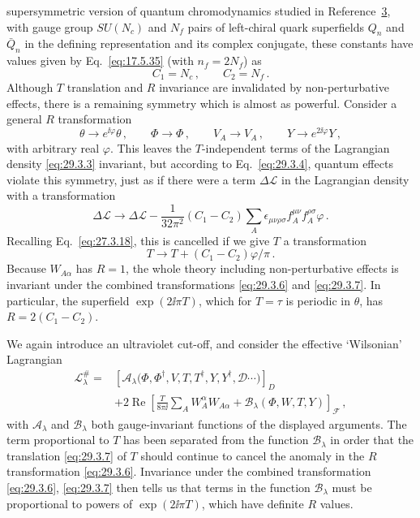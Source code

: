 supersymmetric version of quantum chromodynamics studied in
Reference~\hyperref[ch29-ref-3]{3}, with gauge group \(SU(N_c)\) and
\(N_f\) pairs of left-chiral quark superfields \(Q_n\) and \(\bar Q_n\)
in the defining representation and its complex conjugate, these constants
have values given by Eq.~\eqref{eq:17.5.35} (with \(n_f=2N_f\)) as
\[
  C_1=N_c\,,
  \qquad
  C_2=N_f\,.
\]
Although \(T\) translation and \(R\) invariance are invalidated by
non-perturbative effects, there is a remaining symmetry which is almost as
powerful. Consider a general \(R\) transformation
\begin{equation}
  \theta\longrightarrow e^{\ii\varphi}\theta\,,
  \qquad
  \Phi\longrightarrow\Phi\,,
  \qquad
  V_A\longrightarrow V_A\,,
  \qquad
  Y\longrightarrow e^{2\ii\varphi}Y\,,
  \tag{29.3.6}\label{eq:29.3.6}
\end{equation}
with arbitrary real \(\varphi\). This leaves the \(T\)-independent terms
of the Lagrangian density \eqref{eq:29.3.3} invariant, but according to
Eq.~\eqref{eq:29.3.4}, quantum effects violate this symmetry, just as if
there were a term \(\Delta\mathcal{L}\) in the Lagrangian density with a
transformation
\[
  \Delta\mathcal{L}
  \longrightarrow
  \Delta\mathcal{L}
  -\frac{1}{32\pi^2}(C_1-C_2)
  \sum_A\epsilon_{\mu\nu\rho\sigma}
  f_A^{\mu\nu}f_A^{\rho\sigma}\varphi\,.
\]
Recalling Eq.~\eqref{eq:27.3.18}, this is cancelled if we give \(T\) a
transformation
\begin{equation}
  T\longrightarrow T+(C_1-C_2)\varphi/\pi\,.
  \tag{29.3.7}\label{eq:29.3.7}
\end{equation}
Because \(W_{A\alpha}\) has \(R=1\), the whole theory including
non-perturbative effects is invariant under the combined transformations
\eqref{eq:29.3.6} and \eqref{eq:29.3.7}. In particular, the superfield
\(\exp(2\ii\pi T)\), which for \(T=\tau\) is periodic in \(\theta\), has
\(R=2(C_1-C_2)\).

We again introduce an ultraviolet cut-off, and consider the effective
`Wilsonian' Lagrangian
\begin{equation}
  \begin{aligned}
  \mathcal{L}^{\#}_\lambda
  ={}&
  \left[
    \mathcal{A}_\lambda
    \bigl(\Phi,\Phi^\dagger,V,T,T^\dagger,Y,Y^\dagger,
    \mathcal{D}\cdots\bigr)
  \right]_D
  \\
  &+2\operatorname{Re}
  \left[
    \frac{T}{8\pi \ii}
    \sum_AW_A^\alpha W_{A\alpha}
    +\mathcal{B}_\lambda(\Phi,W,T,Y)
  \right]_{\mathcal{F}}\,,
  \end{aligned}
  \tag{29.3.8}\label{eq:29.3.8}
\end{equation}
with \(\mathcal{A}_\lambda\) and \(\mathcal{B}_\lambda\) both
gauge-invariant functions of the displayed arguments. The term
proportional to \(T\) has been separated from the function
\(\mathcal{B}_\lambda\) in order that the translation
\eqref{eq:29.3.7} of \(T\) should continue to cancel the anomaly in the
\(R\) transformation \eqref{eq:29.3.6}. Invariance under the combined
transformation \eqref{eq:29.3.6}, \eqref{eq:29.3.7} then tells us that
terms in the function \(\mathcal{B}_\lambda\) must be proportional to
powers of \(\exp(2\ii\pi T)\), which have definite \(R\) values.


